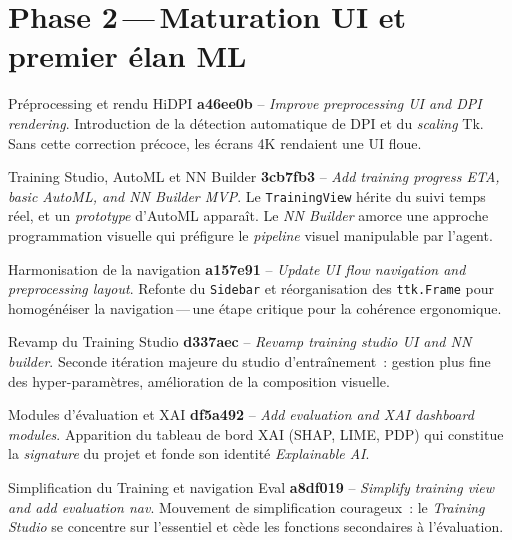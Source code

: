 \documentclass[11pt,a4paper]{report}
\begin{document}
\section{Phase 2\,---\,Maturation UI et premier \'elan ML}

\begin{milestonebox}{Pr\'eprocessing et rendu HiDPI}
\textbf{a46ee0b} -- \textit{Improve preprocessing UI and DPI rendering}.
Introduction de la d\'etection automatique de DPI et du
\textit{scaling} Tk. Sans cette correction pr\'ecoce, les \'ecrans
4K rendaient une UI floue.
\end{milestonebox}

\begin{milestonebox}{Training Studio, AutoML et NN Builder}
\textbf{3cb7fb3} -- \textit{Add training progress ETA, basic AutoML, and NN Builder MVP}.
Le \texttt{TrainingView} h\'erite du suivi temps r\'eel, et un
\textit{prototype} d'AutoML appara\^it. Le \textit{NN Builder}
amorce une approche \og programmation visuelle \fg{} qui pr\'efigure
le \textit{pipeline} visuel manipulable par l'agent.
\end{milestonebox}

\begin{milestonebox}{Harmonisation de la navigation}
\textbf{a157e91} -- \textit{Update UI flow navigation and preprocessing layout}.
Refonte du \texttt{Sidebar} et r\'eorganisation des
\texttt{ttk.Frame} pour homog\'en\'eiser la navigation\,---\,une
\'etape critique pour la coh\'erence ergonomique.
\end{milestonebox}

\begin{milestonebox}{Revamp du Training Studio}
\textbf{d337aec} -- \textit{Revamp training studio UI and NN builder}.
Seconde it\'eration majeure du studio d'entra\^inement~: gestion
plus fine des hyper-param\`etres, am\'elioration de la composition
visuelle.
\end{milestonebox}

\begin{milestonebox}{Modules d'\'evaluation et XAI}
\textbf{df5a492} -- \textit{Add evaluation and XAI dashboard modules}.
Apparition du tableau de bord XAI (SHAP, LIME, PDP) qui constitue
la \textit{signature} du projet et fonde son identit\'e
\textit{Explainable AI}.
\end{milestonebox}

\begin{milestonebox}{Simplification du Training et navigation Eval}
\textbf{a8df019} -- \textit{Simplify training view and add evaluation nav}.
Mouvement de simplification courageux~: le \textit{Training Studio}
se concentre sur l'essentiel et c\`ede les fonctions secondaires
\`a l'\'evaluation.
\end{milestonebox}
\end{document}
